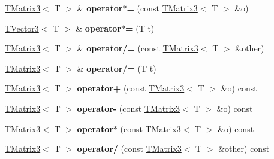 \begin{DoxyCompactItemize}
\item 
\hyperlink{classAudio_1_1TMatrix3}{T\+Matrix3}$<$ T $>$ \& {\bfseries operator$\ast$=} (const \hyperlink{classAudio_1_1TMatrix3}{T\+Matrix3}$<$ T $>$ \&o)\hypertarget{classAudio_1_1TMatrix3_aca62005dc5eae2855f3a1e87d9c0de14}{}\label{classAudio_1_1TMatrix3_aca62005dc5eae2855f3a1e87d9c0de14}

\item 
\hyperlink{classAudio_1_1TVector3}{T\+Vector3}$<$ T $>$ \& {\bfseries operator$\ast$=} (T t)\hypertarget{classAudio_1_1TMatrix3_a0decc92299e92558d38bf9f7f9464834}{}\label{classAudio_1_1TMatrix3_a0decc92299e92558d38bf9f7f9464834}

\item 
\hyperlink{classAudio_1_1TMatrix3}{T\+Matrix3}$<$ T $>$ \& {\bfseries operator/=} (const \hyperlink{classAudio_1_1TMatrix3}{T\+Matrix3}$<$ T $>$ \&other)\hypertarget{classAudio_1_1TMatrix3_ac45080743708793436b80755ec91b595}{}\label{classAudio_1_1TMatrix3_ac45080743708793436b80755ec91b595}

\item 
\hyperlink{classAudio_1_1TMatrix3}{T\+Matrix3}$<$ T $>$ \& {\bfseries operator/=} (T t)\hypertarget{classAudio_1_1TMatrix3_a5965b35f1361b4bc1ef39790dae1578b}{}\label{classAudio_1_1TMatrix3_a5965b35f1361b4bc1ef39790dae1578b}

\item 
\hyperlink{classAudio_1_1TMatrix3}{T\+Matrix3}$<$ T $>$ {\bfseries operator+} (const \hyperlink{classAudio_1_1TMatrix3}{T\+Matrix3}$<$ T $>$ \&o) const \hypertarget{classAudio_1_1TMatrix3_ac0a324cf2c2a0bc8bf179adfa775298b}{}\label{classAudio_1_1TMatrix3_ac0a324cf2c2a0bc8bf179adfa775298b}

\item 
\hyperlink{classAudio_1_1TMatrix3}{T\+Matrix3}$<$ T $>$ {\bfseries operator-\/} (const \hyperlink{classAudio_1_1TMatrix3}{T\+Matrix3}$<$ T $>$ \&o) const \hypertarget{classAudio_1_1TMatrix3_a71f0d6aa4097e956cefb6d71c5dcde04}{}\label{classAudio_1_1TMatrix3_a71f0d6aa4097e956cefb6d71c5dcde04}

\item 
\hyperlink{classAudio_1_1TMatrix3}{T\+Matrix3}$<$ T $>$ {\bfseries operator$\ast$} (const \hyperlink{classAudio_1_1TMatrix3}{T\+Matrix3}$<$ T $>$ \&o) const \hypertarget{classAudio_1_1TMatrix3_a8f3d6148004c4c27a2701c5c8c9aa0b4}{}\label{classAudio_1_1TMatrix3_a8f3d6148004c4c27a2701c5c8c9aa0b4}

\item 
\hyperlink{classAudio_1_1TMatrix3}{T\+Matrix3}$<$ T $>$ {\bfseries operator/} (const \hyperlink{classAudio_1_1TMatrix3}{T\+Matrix3}$<$ T $>$ \&other) const \hypertarget{classAudio_1_1TMatrix3_a2d9a417934e54c74f58526e546a7b573}{}\label{classAudio_1_1TMatrix3_a2d9a417934e54c74f58526e546a7b573}


\end{DoxyCompactItemize}
